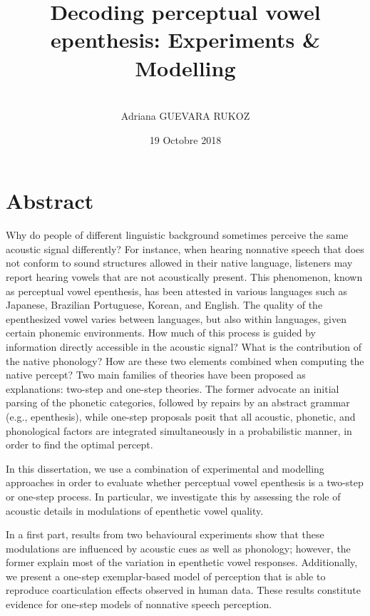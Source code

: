 \documentclass[12pt, twoside]{report}
\title{%
  Decoding perceptual vowel epenthesis: Experiments \& Modelling}
\author{\\Adriana GUEVARA RUKOZ}
\date{19 Octobre 2018}
\begin{document}
\maketitle

\chapter*{Abstract}
Why do people of different linguistic background sometimes perceive the same acoustic signal differently? For instance, when hearing nonnative speech that does not conform to sound structures allowed in their native language, listeners may report hearing vowels that are not acoustically present. This phenomenon, known as perceptual vowel epenthesis, has been attested in various languages such as Japanese, Brazilian Portuguese, Korean, and English. The quality of the epenthesized vowel varies between languages, but also within languages, given certain phonemic environments. 
How much of this process is guided by information directly accessible in the acoustic signal? What is the contribution of the native phonology? How are these two elements combined when computing the native percept? Two main families of theories have been proposed as explanations: two-step and one-step theories. The former advocate an initial parsing of the phonetic categories, followed by repairs by an abstract grammar (e.g., epenthesis), while one-step proposals posit that all acoustic, phonetic, and phonological factors are integrated simultaneously in a probabilistic manner, in order to find the optimal percept.  

In this dissertation, we use a combination of experimental and modelling approaches in order to evaluate whether perceptual vowel epenthesis is a two-step or one-step process. In particular, we investigate this by assessing the role of acoustic details in modulations of epenthetic vowel quality.

In a first part, results from two behavioural experiments show that these modulations are influenced by acoustic cues as well as phonology; however, the former explain most of the variation in epenthetic vowel responses. Additionally, we present a one-step exemplar-based model of perception that is able to reproduce coarticulation effects observed in human data. These results constitute evidence for one-step models of nonnative speech perception.
\end{document}
